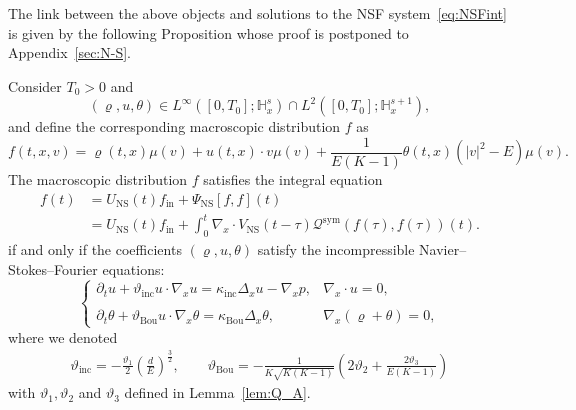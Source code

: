 \documentclass[AHL,Unicode,longabstracts,published]{cedram}
\newcommand{\ini}{\mathrm{in}}
\newcommand{\ns}{\mathrm{NS}}
\newcommand{\sym}{\mathrm{sym}}
\newcommand{\Inc}{\mathrm{inc}}
\newcommand{\Bou}{\mathrm{Bou}}
\newcommand{\bbH}{\mathbb{H}}
\newcommand{\QQ}{\mathcal{Q}}
\begin{document}
The link between the above objects and solutions to the NSF system~\eqref{eq:NSFint} is given by the following Proposition whose proof is postponed to Appendix~\ref{sec:N-S}.

\begin{prop}\label{prop:equivalence_kinetic_hydrodynamic_INSF}
Consider $T_0 > 0$ and
\[
(\varrho, u, \theta) \in L^\infty\left([0, T_0] ; \bbH^s_x \right) \cap L^2\left([0, T_0] ;\bbH^{s+1}_x \right),
\]
and define the corresponding macroscopic distribution $f$ as
\begin{equation}\label{eq:f-macro}
f(t, x, v) = \varrho(t, x) \mu(v) + u(t, x) \cdot v \mu(v) + \frac{1}{E(K-1)} \theta(t, x) \left(|v|^2 - E \right) \mu(v).
\end{equation}
The macroscopic distribution $f$ satisfies the integral equation
\begin{equation}
\begin{split}\label{eq:NS-IntVNS}
f(t) & = U_\ns(t) f_\ini + \Psi_\ns\left[f, f \right](t) \\
& = U_\ns(t) f_\ini + \int_0^t \nabla_x \cdot V_\ns(t-\tau) \QQ^\sym (f(\tau), f(\tau))(t).
\end{split}
\end{equation}
if and only if the coefficients $(\varrho, u, \theta)$ satisfy the incompressible Navier--Stokes--Fourier equations:
\[
\begin{cases}
\partial_t u + \vartheta_\Inc u \cdot \nabla_x u = \kappa_\Inc \Delta_x u - \nabla_x p, & \nabla_x \cdot u = 0, \\
\\
\partial_t \theta + \vartheta_\Bou u \cdot \nabla_x \theta = \kappa_\Bou \Delta_x \theta, & \nabla_x (\varrho + \theta) = 0,
\end{cases}
\]
where we denoted
\begin{gather*}
\vartheta_\Inc = - \frac{\vartheta_1}{2} \left(\frac{d}{E} \right)^{\frac{3}{2}}, \qquad
\vartheta_\Bou = -\frac{1}{ K \sqrt{K(K-1)} } \left(2 \vartheta_2 + \frac{2 \vartheta_3}{E (K-1)} \right)
\end{gather*}
with $\vartheta_1,\vartheta_2$ and $\vartheta_3$ defined in Lemma~\ref{lem:Q_A}.
\end{prop}
\end{document}
